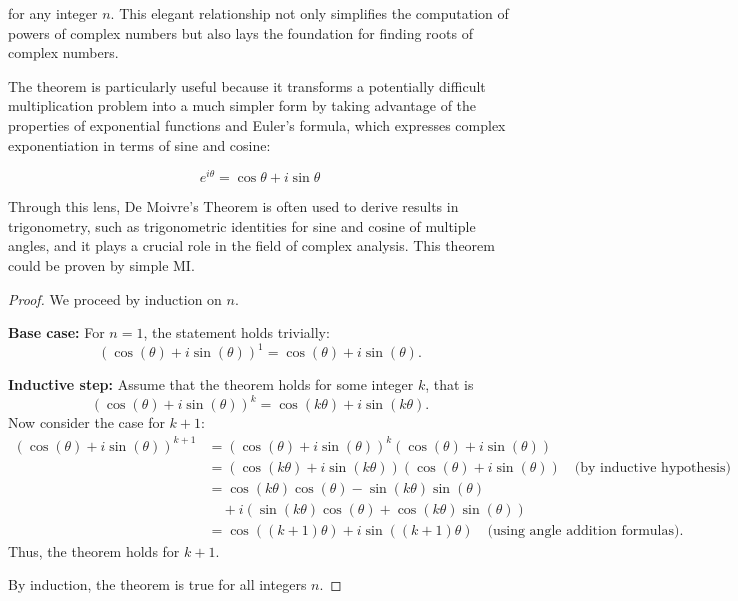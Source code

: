 \documentclass[
	12pt, %
	fleqn, %
	a4paper, %
]{LegrandOrangeBook}
\begin{document}
for any integer \( n \). This elegant relationship not only simplifies the computation of powers of complex numbers but also lays the foundation for finding roots of complex numbers.

The theorem is particularly useful because it transforms a potentially difficult multiplication problem into a much simpler form by taking advantage of the properties of exponential functions and Euler's formula, which expresses complex exponentiation in terms of sine and cosine:

\begin{equation}
    e^{i\theta} = \cos \theta + i\sin \theta
\end{equation}

Through this lens, De Moivre's Theorem is often used to derive results in trigonometry, such as trigonometric identities for sine and cosine of multiple angles, and it plays a crucial role in the field of complex analysis.
This theorem could be proven by simple MI.
\begin{proof}
    We proceed by induction on \( n \).
    
    \textbf{Base case:} For \( n = 1 \), the statement holds trivially:
    \[
    (\cos(\theta) + i \sin(\theta))^1 = \cos(\theta) + i \sin(\theta).
    \]
    
    \textbf{Inductive step:} Assume that the theorem holds for some integer \( k \), that is
    \[
    (\cos(\theta) + i \sin(\theta))^k = \cos(k\theta) + i \sin(k\theta).
    \]
    Now consider the case for \( k + 1 \):
    \begin{align*}
    (\cos(\theta) + i \sin(\theta))^{k+1} &= (\cos(\theta) + i \sin(\theta))^k (\cos(\theta) + i \sin(\theta)) \\
    &= (\cos(k\theta) + i \sin(k\theta))(\cos(\theta) + i \sin(\theta)) \quad \text{(by inductive hypothesis)}\\
    &= \cos(k\theta)\cos(\theta) - \sin(k\theta)\sin(\theta) \\
    &\quad + i(\sin(k\theta)\cos(\theta) + \cos(k\theta)\sin(\theta)) \\
    &= \cos((k+1)\theta) + i \sin((k+1)\theta) \quad \text{(using angle addition formulas)}.
    \end{align*}
    Thus, the theorem holds for \( k + 1 \).
    
    By induction, the theorem is true for all integers \( n \).
    \end{proof}
\end{document}
